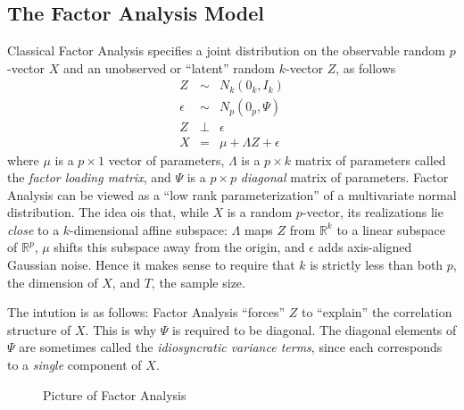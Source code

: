 \documentclass[12pt]{article}
\theoremstyle{definition}
\begin{document}
\subsection{The Factor Analysis Model}
Classical Factor Analysis specifies a joint distribution on the observable random $p$-vector $X$ and an unobserved or ``latent'' random $k$-vector $Z$, as follows
	\begin{eqnarray*}
		Z &\sim& N_k(0_k, I_k)\\
		\epsilon &\sim& N_p(0_p, \Psi)\\
		Z &\perp& \epsilon\\
		X &=& \mu + \Lambda Z + \epsilon
	\end{eqnarray*}
where $\mu$ is a $p\times 1$ vector of parameters, $\Lambda$ is a $p\times k$ matrix of parameters called the \emph{factor loading matrix}, and $\Psi$ is a $p\times p$ \emph{diagonal} matrix of parameters. Factor Analysis can be viewed as a ``low rank parameterization'' of a multivariate normal distribution. The idea ois that, while $X$ is a random $p$-vector, its realizations lie \emph{close} to a $k$-dimensional affine subspace: $\Lambda$ maps $Z$ from $\mathbb{R}^k$ to a linear subspace of $\mathbb{R}^p$, $\mu$ shifts this subspace away from the origin, and $\epsilon$ adds axis-aligned Gaussian noise. Hence it makes sense to require that $k$ is strictly less than both $p$, the dimension of $X$, and $T$, the sample size. 

The intution is as follows: Factor Analysis ``forces'' $Z$ to ``explain'' the correlation structure of $X$. This is why $\Psi$ is required to be diagonal. The diagonal elements of $\Psi$ are sometimes called the \emph{idiosyncratic variance terms}, since each corresponds to a \emph{single} component of $X$. 
\begin{figure}
	\caption{Picture of Factor Analysis}
\end{figure}
\end{document}
